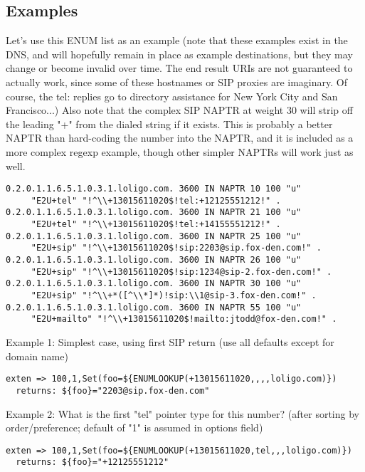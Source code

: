 \subsection{Examples}

Let's use this ENUM list as an example (note that these examples exist
in the DNS, and will hopefully remain in place as example
destinations, but they may change or become invalid over time.  The
end result URIs are not guaranteed to actually work, since some of
these hostnames or SIP proxies are imaginary.  Of course, the tel:
replies go to directory assistance for New York City and San
Francisco...)  Also note that the complex SIP NAPTR at weight 30 will
strip off the leading "+" from the dialed string if it exists.  This
is probably a better NAPTR than hard-coding the number into the NAPTR,
and it is included as a more complex regexp example, though other
simpler NAPTRs will work just as well.

\begin{verbatim}
0.2.0.1.1.6.5.1.0.3.1.loligo.com. 3600 IN NAPTR 10 100 "u"
     "E2U+tel" "!^\\+13015611020$!tel:+12125551212!" .
0.2.0.1.1.6.5.1.0.3.1.loligo.com. 3600 IN NAPTR 21 100 "u"
     "E2U+tel" "!^\\+13015611020$!tel:+14155551212!" .
0.2.0.1.1.6.5.1.0.3.1.loligo.com. 3600 IN NAPTR 25 100 "u"
     "E2U+sip" "!^\\+13015611020$!sip:2203@sip.fox-den.com!" .
0.2.0.1.1.6.5.1.0.3.1.loligo.com. 3600 IN NAPTR 26 100 "u"
     "E2U+sip" "!^\\+13015611020$!sip:1234@sip-2.fox-den.com!" .
0.2.0.1.1.6.5.1.0.3.1.loligo.com. 3600 IN NAPTR 30 100 "u"
     "E2U+sip" "!^\\+*([^\\*]*)!sip:\\1@sip-3.fox-den.com!" .
0.2.0.1.1.6.5.1.0.3.1.loligo.com. 3600 IN NAPTR 55 100 "u"
     "E2U+mailto" "!^\\+13015611020$!mailto:jtodd@fox-den.com!" .
\end{verbatim}

Example 1: Simplest case, using first SIP return (use all defaults
except for domain name)
\begin{verbatim}
exten => 100,1,Set(foo=${ENUMLOOKUP(+13015611020,,,,loligo.com)})
  returns: ${foo}="2203@sip.fox-den.com"
\end{verbatim}

Example 2: What is the first "tel" pointer type for this number?
(after sorting by order/preference; default of "1" is assumed in
options field)
\begin{verbatim}
exten => 100,1,Set(foo=${ENUMLOOKUP(+13015611020,tel,,,loligo.com)})
  returns: ${foo}="+12125551212"
\end{verbatim}

